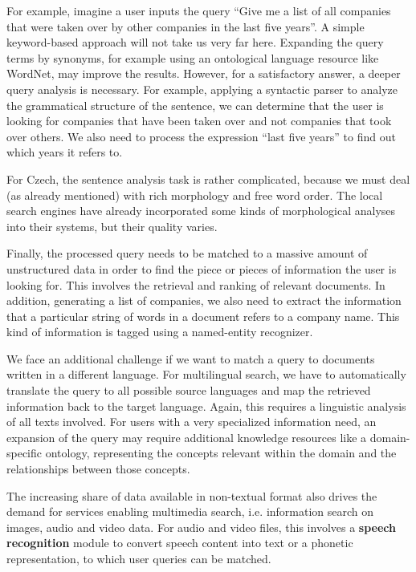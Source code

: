 \begin{multicols}{2}
For example, imagine a user inputs the query “Give me a list of all companies that were taken over by other companies in the last five years”. A simple keyword-based approach will not take us very far here. Expanding the query terms by synonyms, for example using an ontological language resource like WordNet, may improve the results. However, for a satisfactory answer, a deeper query analysis is necessary. For example, applying a syntactic parser to analyze the grammatical structure of the sentence, we can determine that the user is looking for companies that have been taken over and not companies that took over others. We also need to process the expression “last five years” to find out which years it refers to.

For Czech, the sentence analysis task is rather complicated, because we must deal (as already mentioned) with rich morphology and free word order. The local search engines have already incorporated some kinds of morphological analyses into their systems, but their quality varies.

Finally, the processed query needs to be matched to a massive amount of unstructured data in order to find the piece or pieces of information the user is looking for. This involves the retrieval and ranking of relevant documents. In addition, generating a list of companies, we also need to extract the information that a particular string of words in a document refers to a company name. This kind of information is tagged using a named-entity recognizer.

We face an additional challenge if we want to match a query to documents written in a different language. For multilingual search, we have to automatically translate the query to all possible source languages and map the retrieved information back to the target language. Again, this requires a linguistic analysis of all texts involved. For users with a very specialized information need, an expansion of the query may require additional knowledge resources like a domain-specific ontology, representing the concepts relevant within the domain and the relationships between those concepts.

The increasing share of data available in non-textual format also drives the demand for services enabling multimedia search, i.e. information search on images, audio and video data. For audio and video files, this involves a \textbf{speech recognition} module to convert speech content into text or a phonetic representation, to which user queries can be matched.  
  

\end{multicols}
